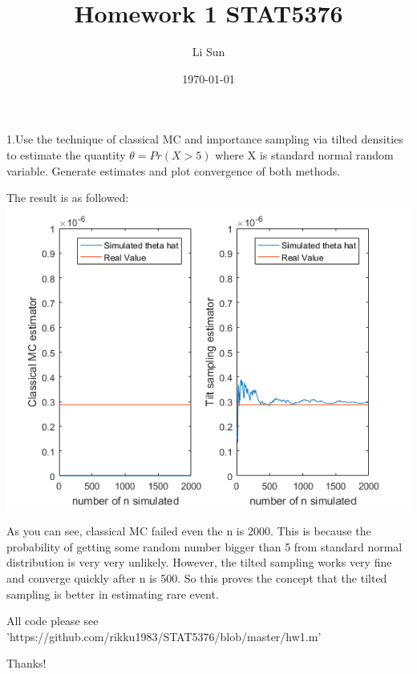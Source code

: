 \documentclass[11pt]{article}
\begin{document}
\title{Homework 1 STAT5376}
\author{Li Sun}
\date{\today}
\maketitle

\noindent
1.Use the technique of classical MC and importance sampling via tilted densities to estimate the quantity $\theta=Pr(X>5)$ where X is standard normal random variable. Generate estimates and plot convergence of both methods.

The result is as followed:\\
\includegraphics[scale=1]{hw1p1.png}

\bigskip
As you can see, classical MC failed even the n is 2000. This is because the probability of getting some random number bigger than 5 from standard normal distribution is very very unlikely. However, the tilted sampling works very fine and converge quickly after n is 500. So this proves the concept that the tilted sampling is better in estimating rare event.

All code please see 'https://github.com/rikku1983/STAT5376/blob/master/hw1.m'\\
\bigskip

Thanks!
\end{document}
